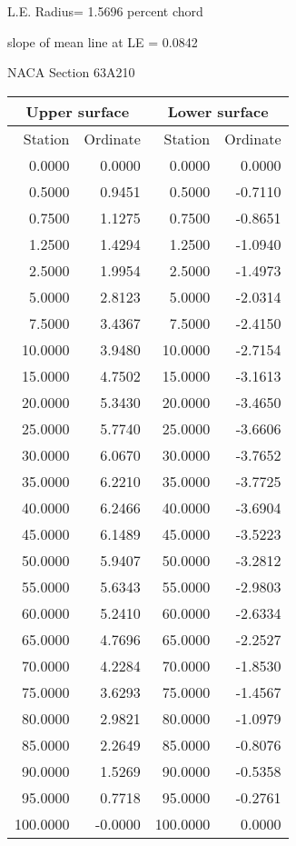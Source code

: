 \documentclass[11pt]{book}
\begin{document}
L.E. Radius=  1.5696 percent chord


 slope of mean line at LE =  0.0842
 \newpage
  \label{s63A210}
 \begin{Large}
 NACA Section 63A210
 \end{Large}
  
 \vspace{8mm}
 \begin{tabular}{|r|r|r|r|} \hline 
 \multicolumn{2}{|c|}{Upper surface} & \multicolumn{2}{|c|}{Lower surface} \\
 \hline
 Station & Ordinate & Station & Ordinate \\
 \hline
0.0000 & 0.0000 & 0.0000 & 0.0000 \\
0.5000 & 0.9451 & 0.5000 & -0.7110 \\
0.7500 & 1.1275 & 0.7500 & -0.8651 \\
1.2500 & 1.4294 & 1.2500 & -1.0940 \\
2.5000 & 1.9954 & 2.5000 & -1.4973 \\
5.0000 & 2.8123 & 5.0000 & -2.0314 \\
7.5000 & 3.4367 & 7.5000 & -2.4150 \\
10.0000 & 3.9480 & 10.0000 & -2.7154 \\
15.0000 & 4.7502 & 15.0000 & -3.1613 \\
20.0000 & 5.3430 & 20.0000 & -3.4650 \\
25.0000 & 5.7740 & 25.0000 & -3.6606 \\
30.0000 & 6.0670 & 30.0000 & -3.7652 \\
35.0000 & 6.2210 & 35.0000 & -3.7725 \\
40.0000 & 6.2466 & 40.0000 & -3.6904 \\
45.0000 & 6.1489 & 45.0000 & -3.5223 \\
50.0000 & 5.9407 & 50.0000 & -3.2812 \\
55.0000 & 5.6343 & 55.0000 & -2.9803 \\
60.0000 & 5.2410 & 60.0000 & -2.6334 \\
65.0000 & 4.7696 & 65.0000 & -2.2527 \\
70.0000 & 4.2284 & 70.0000 & -1.8530 \\
75.0000 & 3.6293 & 75.0000 & -1.4567 \\
80.0000 & 2.9821 & 80.0000 & -1.0979 \\
85.0000 & 2.2649 & 85.0000 & -0.8076 \\
90.0000 & 1.5269 & 90.0000 & -0.5358 \\
95.0000 & 0.7718 & 95.0000 & -0.2761 \\
100.0000 & -0.0000 & 100.0000 & 0.0000 \\
 \hline 
 \end{tabular}
\end{document}
